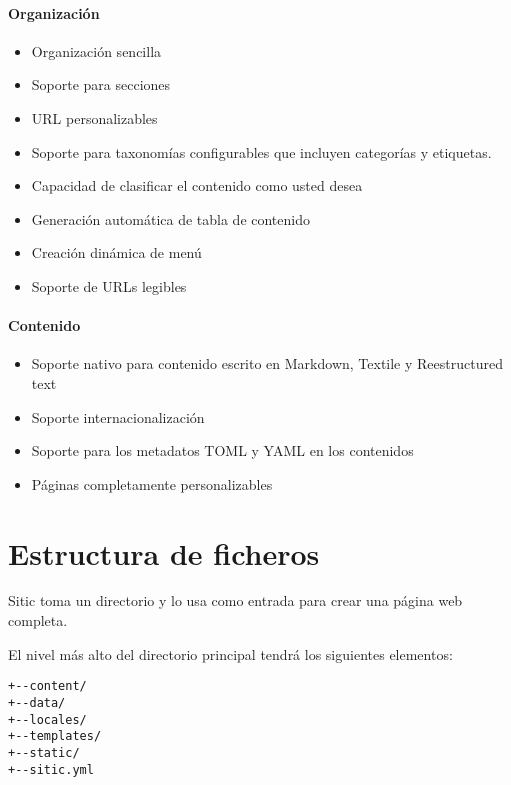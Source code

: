 \paragraph{Organización}

\begin{itemize}
\item Organización sencilla
\item Soporte para secciones
\item URL personalizables
\item Soporte para taxonomías configurables que incluyen categorías y etiquetas.
\item Capacidad de clasificar el contenido como usted desea
\item Generación automática de tabla de contenido
\item Creación dinámica de menú
\item Soporte de URLs legibles
\end{itemize}

\paragraph{Contenido}

\begin{itemize}
\item Soporte nativo para contenido escrito en Markdown, Textile y Reestructured text
\item Soporte internacionalización
\item Soporte para los metadatos TOML y YAML en los contenidos
\item Páginas completamente personalizables
\end{itemize}


\section{Estructura de ficheros}

Sitic toma un directorio y lo usa como entrada para crear una página web completa.

El nivel más alto del directorio principal tendrá los siguientes elementos:

\begin{verbatim}
+--content/
+--data/
+--locales/
+--templates/
+--static/
+--sitic.yml
\end{verbatim}

